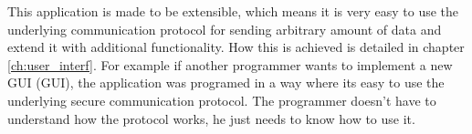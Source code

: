 This application is made to be extensible, which means it is very easy to use the underlying communication protocol for sending arbitrary amount of data and extend it with additional functionality. How this is achieved is detailed in chapter \ref{ch:user_interf}. For example if another programmer wants to implement a new GUI (\acl{GUI}), the application was programed in a way where its easy to use the underlying secure communication protocol. The programmer doesn't have to understand how the protocol works, he just needs to know how to use it.